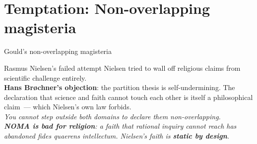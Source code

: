 \documentclass{beamer}
\begin{document}

\section{Temptation: Non-overlapping magisteria}

\begin{frame}{Gould's non-overlapping magisteria}
  \vspace{0.5em}
  \centering
\end{frame}

\begin{frame}{Rasmus Nielsen's failed attempt}
  Nielsen tried to wall off religious claims from scientific challenge entirely.\\[1em]
  \textbf{Hans Br\o{}chner's objection}: the partition thesis is self-undermining. The declaration that science and faith cannot touch each other is itself a philosophical claim~--- which Nielsen's own law forbids.\\[0.5em]
  \itshape You cannot step outside both domains to declare them non-overlapping.\\[1em]
  \upshape\textbf{NOMA is bad for religion}: a faith that rational inquiry cannot reach has abandoned \emph{fides quaerens intellectum}. Nielsen's faith is \textbf{static by design}.
\end{frame}
\end{document}
